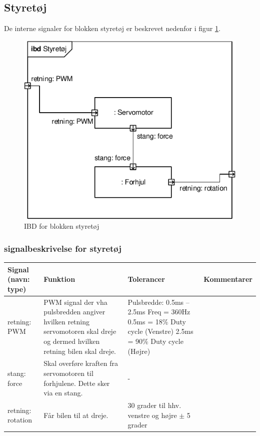 \subsection{Styretøj}

De interne signaler for blokken styretøj er beskrevet nedenfor i figur \ref{fig:ibd_styretoej}.

\begin{figure}[h]
\centering
\includegraphics[scale=1]{../fig/diagrammer/bil/ibd_styretoej.pdf}
\caption{IBD for blokken styretøj}
\label{fig:ibd_styretoej}
\end{figure}

\subsubsection{signalbeskrivelse for styretøj}

\begin{table}[h]
	\centering
	\begin{tabularx}{\textwidth}{|l|X|X|X|} \hline
	\textbf{Signal (navn: type)} & \textbf{Funktion} & \textbf{Tolerancer} & \textbf{Kommentarer} \\ \hline
retning: PWM 
	& PWM signal der vha pulsbredden angiver hvilken retning servomotoren skal 				dreje og dermed hvilken retning bilen skal dreje. 
	& Pulsbredde: 0.5ms – 2.5ms \newline
		Freq = 360Hz \newline
		0.5ms = 18\% Duty cycle (Venstre)\newline
		2.5ms = 90\% Duty cycle (Højre)
	& ~
	\\ \hline
stang: force 
	& Skal overføre kraften fra servomotoren til forhjulene. Dette sker via en 				stang.
	& -
	& ~
	\\ \hline
retning: rotation
	& Får bilen til at dreje.
	& 30 grader til hhv. venstre og højre $\pm$ 5 grader
	& ~
	\\ \hline
	\end{tabularx}
\end{table}